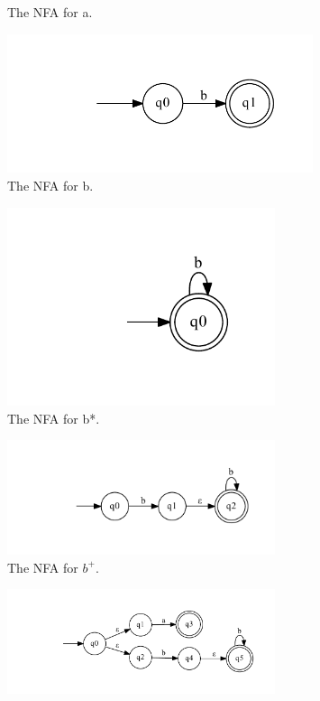 \documentclass[10pt] {article}
\begin{document}
\begin{enumerate}
\begin{figure}[H]
\caption{The NFA for a.}
\label{45}
\end{figure}
\begin{figure}[H]
\includegraphics[width=0.8\textwidth]{ab28.pdf}
\caption{The NFA for b.}
\label{46}
\end{figure}
\begin{figure}[H]
\includegraphics[width=0.7\textwidth]{ca28.pdf}
\caption{The NFA for b*.}
\label{47}
\end{figure}
\begin{figure}[H]
\includegraphics[width=0.7\textwidth]{cb28.pdf}
\caption{The NFA for $b^{+}$.}
\label{48}
\end{figure}
\begin{figure}[H]
\includegraphics[width=0.7\textwidth]{cc28.pdf}

\end{figure}
\end{enumerate}
\end{document}
